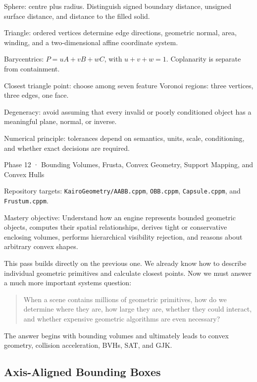 Sphere: centre plus radius. Distinguish signed boundary distance, unsigned surface distance, and distance to the filled solid.

Triangle: ordered vertices determine edge directions, geometric normal, area, winding, and a two-dimensional affine coordinate system.

Barycentrics: \(P=uA+vB+wC\), with \(u+v+w=1\). Coplanarity is separate from containment.

Closest triangle point: choose among seven feature Voronoi regions: three vertices, three edges, one face.

Degeneracy: avoid assuming that every invalid or poorly conditioned object has a meaningful plane, normal, or inverse.

Numerical principle: tolerances depend on semantics, units, scale, conditioning, and whether exact decisions are required.

Phase 12 · Bounding Volumes, Frusta, Convex Geometry, Support Mapping, and Convex Hulls

Repository targets: \texttt{KairoGeometry/AABB.cppm}, \texttt{OBB.cppm}, \texttt{Capsule.cppm}, and \texttt{Frustum.cppm}.

Mastery objective: Understand how an engine represents bounded geometric objects, computes their spatial relationships, derives tight or conservative enclosing volumes, performs hierarchical visibility rejection, and reasons about arbitrary convex shapes.

This pass builds directly on the previous one. We already know how to describe individual geometric primitives and calculate closest points. Now we must answer a much more important systems question:

\begin{quote}
When a scene contains millions of geometric primitives, how do we determine where they are, how large they are, whether they could interact, and whether expensive geometric algorithms are even necessary?
\end{quote}

The answer begins with bounding volumes and ultimately leads to convex geometry, collision acceleration, BVHs, SAT, and GJK.

\subsection{Axis-Aligned Bounding Boxes}\label{03-visual-computing-i-ch021-axis-aligned-bounding-boxes}

